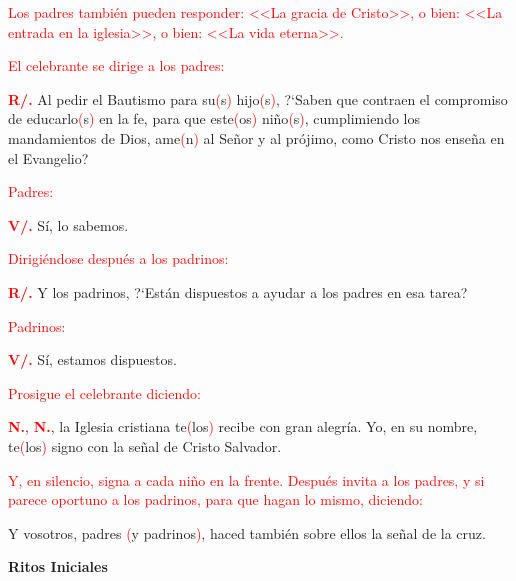 \documentclass[12pt, letterpaper]{report}
\begin{document}
\large {\textcolor{red}{Los padres tambi\'en pueden responder: <<La gracia de Cristo>>, o bien: <<La entrada en la iglesia>>, o bien: <<La vida eterna>>.}}

\large {\textcolor{red}{El celebrante se dirige a los padres:}}

\Large {\bfseries \textcolor{red}{R/.}} \hspace{1cm} \Large {Al pedir el Bautismo para su\textcolor{red}{(}s\textcolor{red}{)} hijo\textcolor{red}{(}s\textcolor{red}{)}, ?`Saben que contraen el compromiso de educarlo\textcolor{red}{(}s\textcolor{red}{)} en la fe, para que este\textcolor{red}{(}os\textcolor{red}{)} ni\~no\textcolor{red}{(}s\textcolor{red}{)}, cumplimiendo los mandamientos de Dios, ame\textcolor{red}{(}n\textcolor{red}{)} al Se\~nor y al pr\'ojimo, como Cristo nos ense\~na en el Evangelio?}

\large {\textcolor{red}{Padres:}}

{\bfseries \textcolor{red}{V/.}} \hspace{1cm} S\'i, lo sabemos.

\large {\textcolor{red}{Dirigi\'endose despu\'es a los padrinos:}}

\Large {\bfseries \textcolor{red}{R/.}} \hspace{1cm} Y los padrinos, ?`Est\'an dispuestos a ayudar a los padres en esa tarea?

\large {\textcolor{red}{Padrinos:}}

{\bfseries \textcolor{red}{V/.}} \hspace{1cm} S\'i, estamos dispuestos. 

\large {\textcolor{red}{Prosigue el celebrante diciendo:}} 

\noindent
\Large {\bfseries \textcolor{red}{N.}}, \Large {\bfseries \textcolor{red}{N.}}, \Large {la Iglesia cristiana te\textcolor{red}{(}los\textcolor{red}{)} recibe con gran alegr\'ia. Yo, en su nombre, te\textcolor{red}{(}los\textcolor{red}{)} signo con la se\~nal de Cristo Salvador.}

\large {\textcolor{red}{Y, en silencio, signa a cada ni\~no en la frente. Despu\'es invita a los padres, y si parece oportuno a los padrinos, para que hagan lo mismo, diciendo:}} 

\noindent
\Large {Y vosotros, padres \textcolor{red}{(}y padrinos\textcolor{red}{)}, haced tambi\'en sobre ellos la se\~nal de la cruz.}

\begin{center}
\Huge {\bfseries Ritos Iniciales}
\end{center}
\end{document}

